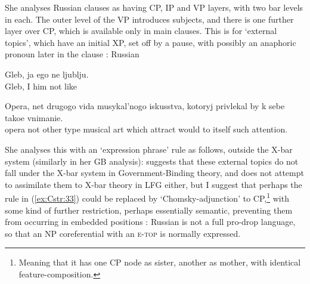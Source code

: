 \documentclass[output=paper,hidelinks]{langscibook}
\begin{document}
She analyses Russian clauses as having CP, IP and VP layers, with two bar levels in each. The outer level of the VP introduces subjects, and there is one further layer over CP, which is available only in main clauses. This is for ‘external topics’, which have an initial XP, set off by a pause, with possibly an anaphoric pronoun later in the clause  \citep[202]{King95}: 
\ea Russian
\begin{xlist}
\item
\gll Gleb, ja ego ne ljublju.\\
Gleb, I him not like\\
\item
\gll Opera, net drugogo vida musykal'nogo iskusstva, kotoryj privlekal by k sebe takoe vnimanie.\\
opera not other type musical art which attract would to itself such attention.\\
\end{xlist}
\z
She analyses this with an `expression phrase' rule \citep{Banfield:Unspeakable,Rudin1985}  as follows, outside the
X-bar system (similarly in her GB analysis):
\ea\label{ex:Cstr:33}
\z
\citet[105]{King95} suggests that these external topics do  not fall under the X-bar
system in Government-Binding theory, and does not attempt to assimilate them
to X-bar theory in LFG either, but I suggest that perhaps the rule in (\ref{ex:Cstr:33}) could be replaced by
`Chomsky-adjunction' to CP,\footnote
 {Meaning that it has one CP node as sister, another as mother,  with identical
 feature-composition.}
with some kind of further restriction, perhaps essentially
semantic, preventing them from occurring in embedded positions \citep[106]{King95}:
\ea
{}
\z
Russian is not a full pro-drop language, so that an NP coreferential with
an \textsc{e-top} is normally expressed.
\end{document}
